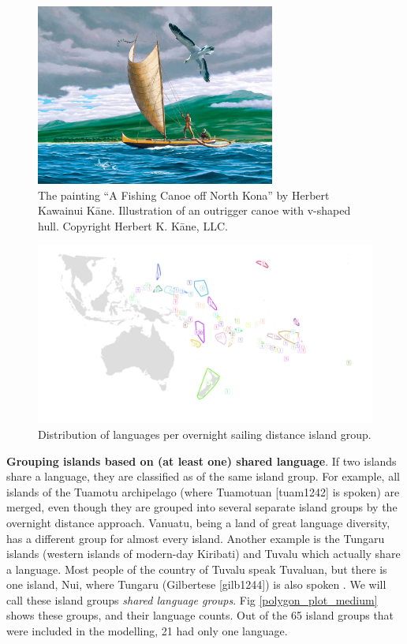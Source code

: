 \documentclass[unnumsec,webpdf,modern,medium]{oup-authoring-template}
\begin{document}
\begin{appendices}
\begin{figure}[ht]
\centering
\includegraphics[width=0.7\textwidth]{Herb-Kane_Fishing-Canoe-off-North-Kona.jpg}
\caption{{The painting ``A Fishing Canoe off North Kona'' by Herbert Kawainui K{\=a}ne. Illustration of an outrigger canoe with v-shaped hull. Copyright Herbert K. K{\=a}ne, LLC.}}
\label{kane_fishing_canoe}
\end{figure}

\begin{figure}
\centering
\includegraphics[width=\textwidth]{polygon_SBZR_group_map}
\caption{{Distribution of languages per overnight sailing distance island group.}}
\label{polygon_plot_SBZR}
\end{figure}

\textbf{Grouping islands based on (at least one) shared language}. If two islands share a language, they are classified as of the same island group. For example, all islands of the Tuamotu archipelago (where Tuamotuan [tuam1242] is spoken) are merged, even though they are grouped into several separate island groups by the overnight distance approach. Vanuatu, being a land of great language diversity, has a different group for almost every island. Another example is the Tungaru islands (western islands of modern-day Kiribati) and Tuvalu which actually share a language. Most people of the country of Tuvalu speak Tuvaluan, but there is one island, Nui, where Tungaru (Gilbertese [gilb1244]) is also spoken \citep{faaniu1983tuvalu, macdonald_2020, omniglot_tuvaluan}. We will call these island groups \textit{shared language groups}. Fig \ref{polygon_plot_medium} shows these groups, and their language counts. Out of the 65 island groups that were included in the modelling, 21 had only one language.


\end{appendices}
\end{document}
